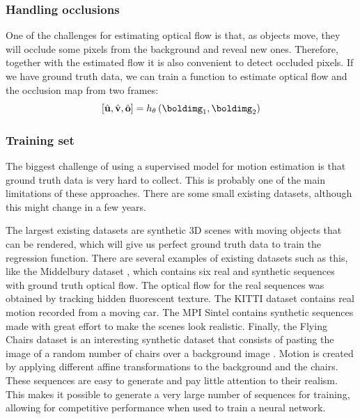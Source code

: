 \subsubsection{Handling occlusions}
One of the challenges for estimating optical flow is that, as objects move, they will occlude some pixels from the background and reveal new ones. Therefore, together with the estimated flow it is also convenient to detect occluded pixels. If we have ground truth data, we can train a function to estimate optical flow and the occlusion map from two frames:
\begin{equation}
    \left[ \hat{\mathbf{u}}, \hat{\mathbf{v}}, \hat{\mathbf{o}} \right] =
    h_\theta \left( \boldimg_1, \boldimg_2 \right)
\end{equation}

\subsubsection{Training set}
The biggest challenge of using a supervised model for motion estimation is that ground truth data is very hard to collect. This is probably one of the main limitations of these approaches. There are some small existing datasets, although this might change in a few years.

The largest existing datasets are synthetic 3D scenes with moving objects that can be rendered, which will give us perfect ground truth data to train the regression function. There are several examples of existing datasets such as this, like the Middelbury dataset \cite{Scharstein2002}, which contains six real and synthetic sequences with ground truth optical flow. The optical flow for the real sequences was obtained by tracking hidden fluorescent texture.
The KITTI dataset \cite{Geiger2013} contains real motion recorded from a moving car. The MPI Sintel \cite{Butler:ECCV:2012} contains synthetic sequences made with great effort to make the scenes look realistic. Finally, the Flying Chairs dataset is an interesting synthetic dataset that consists of pasting the image of a random number of chairs over a background image \cite{Dosovitskiy2015}. Motion is created by applying different affine transformations to the background and the chairs. These sequences are easy to generate and pay little attention to their realism. This makes it possible to generate a very large number of sequences for training, allowing for competitive performance when used to train a neural network.

